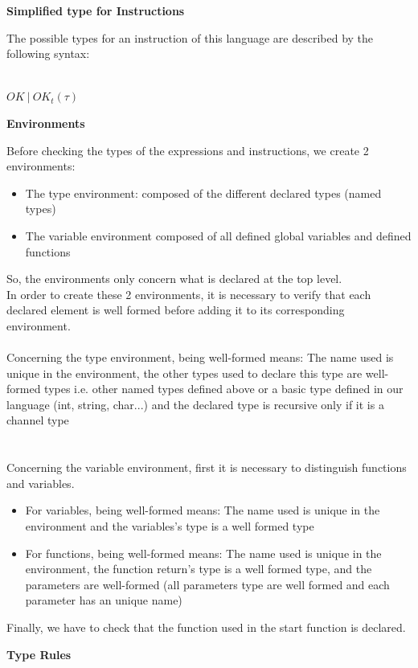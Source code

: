 \documentclass[11pt]{report}
\begin{document}
\tabto{0cm} {\Large \textbf{Simplified type for Instructions}}

\tabto{0cm}The possible types for an instruction of this language are described by the following syntax:
\\ \\
\centerline{$OK \ | \ OK_t(\tau)$}

\tabto{0cm} {\Large \textbf{Environments}}

\tabto{0cm} Before checking the types of the expressions and instructions, we create 2 environments:
\begin{itemize}
\item The type environment: composed of the different declared types (named types)
\item The variable environment composed of all defined global variables and defined functions
\end{itemize}
So, the environments only concern what is declared at the top level.\\

In order to create these 2 environments, it is necessary to verify that each declared element is well formed before adding it to its corresponding environment.\\ \\
Concerning the type environment, being well-formed means: 
The name used is unique in the environment, the other types used to declare this type are well-formed types i.e. other named types defined above or a basic type defined in our language (int, string, char...) and the declared type is recursive only if it is a channel type\\ \\ \\
Concerning the variable environment, first it is  necessary to distinguish functions and variables.
\begin{itemize}
    \item  For variables, being well-formed means: The name used is unique in the environment and the variables's type is a well formed type
    \item For functions, being well-formed means: The name used is unique in the environment, the function return's type is a well formed type, and the parameters are well-formed (all parameters type are well formed and each parameter has an unique name)
\end{itemize}
Finally, we have to check that the function used in the start function is declared.

\newpage
\centerline{\textbf{\Huge Type Rules}}
\vspace*{35pt}
\end{document}
